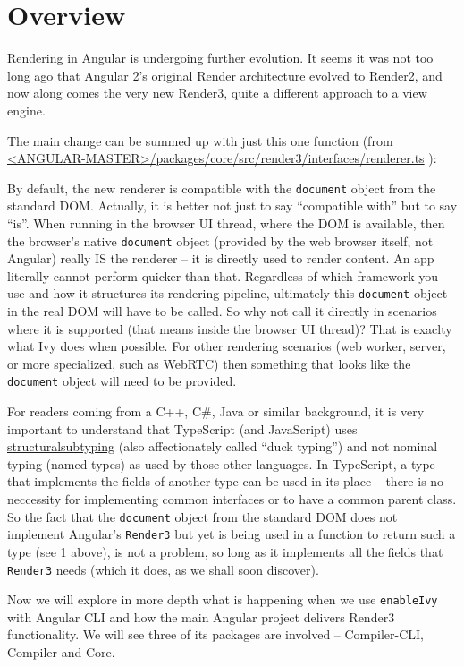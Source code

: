 \section{Overview}

Rendering in Angular is undergoing further evolution. It seems it was not too long ago
that Angular 2’s original Render architecture evolved to Render2, and now along
comes the very new Render3, quite a different approach to a view engine.

The main change can be summed up with just this one function
(from
\href{https://github.com/angular/angular/blob/master/packages/core/src/render3/interfaces/renderer.ts}
{<ANGULAR-MASTER>/packages/core/src/render3/interfaces/renderer.ts}
):



By default, the new renderer is compatible with the
\texttt{document}
object from the
standard DOM. Actually, it is better not just to say “compatible with” but to say “is”.
When running in the browser UI thread, where the DOM is available, then the
browser’s native
\texttt{document}
object (provided by the web browser itself, not Angular)
really IS the renderer – it is directly used to render content. An app literally cannot
perform quicker than that. Regardless of which framework you use and how it
structures its rendering pipeline, ultimately this
\texttt{document}
object in the real DOM will
have to be called. So why not call it directly in scenarios where it is supported (that
means inside the browser UI thread)? That is exaclty what Ivy does when possible.
For other rendering scenarios (web worker, server, or more specialized, such as
WebRTC) then something that looks like the
\texttt{document}
object will need to be provided.

For readers coming from a C++, C\#, Java or similar background, it is very important
to understand that TypeScript (and JavaScript) uses
\url{structuralsubtyping}
(also
affectionately called “duck typing”) and not nominal typing (named types) as used by
those other languages. In TypeScript, a type that implements the fields of another
type can be used in its place – there is no neccessity for implementing common
interfaces or to have a common parent class. So the fact that the
\texttt{document}
object
from the standard DOM does not implement Angular’s
\texttt{Render3}
but yet is being used
in a function to return such a type (see
1
above), is not a problem, so long as it
implements all the fields that
\texttt{Render3}
needs (which it does, as we shall soon
discover).

Now we will explore in more depth what is happening when we use
\texttt{enableIvy}
with
Angular CLI and how the main Angular project delivers Render3 functionality. We will
see three of its packages are involved – Compiler-CLI, Compiler and Core.




